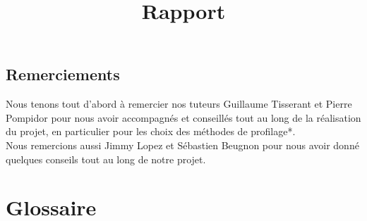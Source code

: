 \documentclass{report}
\title{Rapport}
\author{}
\date{}
\begin{document}



\newpage
\null %
\newpage


\section*{Remerciements}
\hspace{0.5cm}Nous tenons tout d'abord à remercier nos tuteurs Guillaume Tisserant et Pierre Pompidor pour nous avoir accompagnés et conseillés tout au long de la réalisation du projet, en particulier pour les choix des méthodes de profilage*.\\

Nous remercions aussi  Jimmy Lopez et Sébastien Beugnon pour nous avoir donné quelques conseils tout au long de notre projet.
	
	


\newpage

            


\tableofcontents %

\newpage

\listoffigures %

\newpage
\chapter*{Glossaire}
\end{document}
